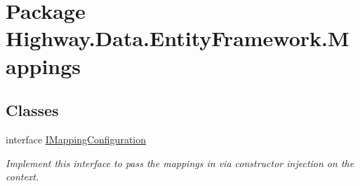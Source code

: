 \hypertarget{namespace_highway_1_1_data_1_1_entity_framework_1_1_mappings}{\section{Package Highway.\-Data.\-Entity\-Framework.\-Mappings}
\label{namespace_highway_1_1_data_1_1_entity_framework_1_1_mappings}
}
\subsection*{Classes}
\begin{DoxyCompactItemize}
\item 
interface \hyperlink{interface_highway_1_1_data_1_1_entity_framework_1_1_mappings_1_1_i_mapping_configuration}{I\-Mapping\-Configuration}
\begin{DoxyCompactList}\small\item\em Implement this interface to pass the mappings in via constructor injection on the context. \end{DoxyCompactList}\end{DoxyCompactItemize}
